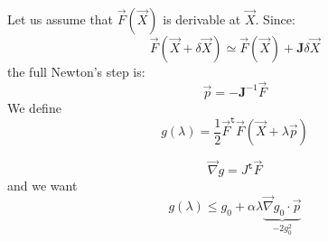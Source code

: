 \documentclass[aps,12pt]{revtex4}
\newcommand{\trn}[1]{{#1}^{\mathtt{t}}}
\begin{document}
Let us assume that $\vec{F}(\vec{X})$ is derivable at $\vec{X}$.
Since:
\begin{equation}
	\vec{F}(\vec{X}+\delta\vec{X}) \simeq \vec{F}(\vec{X}) + \bm{J} \delta\vec{X}
\end{equation}
the full Newton's step is:
\begin{equation}
	\vec{p} = - \bm{J}^{-1} \vec{F}
\end{equation}
We define
\begin{equation}
	g(\lambda) = \dfrac{1}{2} \trn{\vec{F}}  \vec{F} (\vec{X}+\lambda \vec{p})
\end{equation}

\begin{equation}
	\vec{\nabla}g = \trn{J}\vec{F}
\end{equation}
and we want
\begin{equation}
	g(\lambda) \leq g_0 + \alpha \lambda \underbrace{\vec{\nabla}g_0 \cdot \vec{p}}_{-2g_0^2}
\end{equation}
\end{document}
